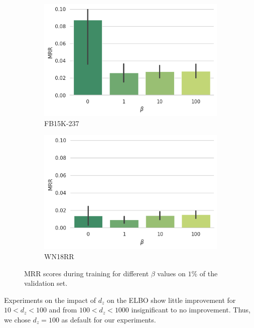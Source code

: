 \begin{figure}[H]
  \centering
  \begin{subfigure}{.5\textwidth}
    \centering
    \includegraphics[height=.6\textwidth, keepaspectratio]{graphs/plots/beta_mrr_fb.png}
    \caption{FB15K-237}
    \label{fig5:betamrrfb}
  \end{subfigure}%
  \begin{subfigure}{.5\textwidth}
    \centering
    \includegraphics[height=.6\textwidth, keepaspectratio]{graphs/plots/beta_mrr_wn.png}
    \caption{WN18RR}
    \label{fig5:betamrrwn}
  \end{subfigure}
  \caption{MRR scores during training for different $\beta$ values on $1\%$ of the validation set.}
  \label{fig5:betafbmrr}
\end{figure}


Experiments on the impact of $d_z$ on the ELBO show little improvement for $10<d_z<100$ and from $100<d_z<1000$ insignificant to no improvement. Thus, we chose $d_z=100$ as default for our experiments.



